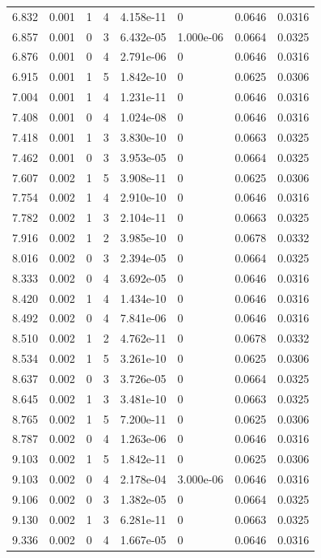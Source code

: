 \documentclass[preview]{standalone}
\begin{document}
{{{\begin{tabular}{L{1.2cm}C{1.2cm} C{0.3cm}C{0.5cm} C{1.4cm}C{1.4cm} C{1.4cm}C{1.4cm}}
  6.832  &  0.001  & 1     &  4 &  4.158e-11  & 0  & 0.0646 &  0.0316   \\ 
  6.857  &  0.001  & 0     &  3 &  6.432e-05  & 1.000e-06  & 0.0664 &  0.0325   \\ 
  6.876  &  0.001  & 0     &  4 &  2.791e-06  & 0  & 0.0646 &  0.0316   \\ 
  6.915  &  0.001  & 1     &  5 &  1.842e-10  & 0  & 0.0625 &  0.0306   \\ 
  7.004  &  0.001  & 1     &  4 &  1.231e-11  & 0  & 0.0646 &  0.0316   \\ 
  7.408  &  0.001  & 0     &  4 &  1.024e-08  & 0  & 0.0646 &  0.0316   \\ 
  7.418  &  0.001  & 1     &  3 &  3.830e-10  & 0  & 0.0663 &  0.0325   \\ 
  7.462  &  0.001  & 0     &  3 &  3.953e-05  & 0  & 0.0664 &  0.0325   \\ 
  7.607  &  0.002  & 1     &  5 &  3.908e-11  & 0  & 0.0625 &  0.0306   \\ 
  7.754  &  0.002  & 1     &  4 &  2.910e-10  & 0  & 0.0646 &  0.0316   \\ 
  7.782  &  0.002  & 1     &  3 &  2.104e-11  & 0  & 0.0663 &  0.0325   \\ 
  7.916  &  0.002  & 1     &  2 &  3.985e-10  & 0  & 0.0678 &  0.0332   \\ 
  8.016  &  0.002  & 0     &  3 &  2.394e-05  & 0  & 0.0664 &  0.0325   \\ 
  8.333  &  0.002  & 0     &  4 &  3.692e-05  & 0  & 0.0646 &  0.0316   \\ 
  8.420  &  0.002  & 1     &  4 &  1.434e-10  & 0  & 0.0646 &  0.0316   \\ 
  8.492  &  0.002  & 0     &  4 &  7.841e-06  & 0  & 0.0646 &  0.0316   \\ 
  8.510  &  0.002  & 1     &  2 &  4.762e-11  & 0  & 0.0678 &  0.0332   \\ 
  8.534  &  0.002  & 1     &  5 &  3.261e-10  & 0  & 0.0625 &  0.0306   \\ 
  8.637  &  0.002  & 0     &  3 &  3.726e-05  & 0  & 0.0664 &  0.0325   \\ 
  8.645  &  0.002  & 1     &  3 &  3.481e-10  & 0  & 0.0663 &  0.0325   \\ 
  8.765  &  0.002  & 1     &  5 &  7.200e-11  & 0  & 0.0625 &  0.0306   \\ 
  8.787  &  0.002  & 0     &  4 &  1.263e-06  & 0  & 0.0646 &  0.0316   \\ 
  9.103  &  0.002  & 1     &  5 &  1.842e-11  & 0  & 0.0625 &  0.0306   \\ 
  9.103  &  0.002  & 0     &  4 &  2.178e-04  & 3.000e-06  & 0.0646 &  0.0316   \\ 
  9.106  &  0.002  & 0     &  3 &  1.382e-05  & 0  & 0.0664 &  0.0325   \\ 
  9.130  &  0.002  & 1     &  3 &  6.281e-11  & 0  & 0.0663 &  0.0325   \\ 
  9.336  &  0.002  & 0     &  4 &  1.667e-05  & 0  & 0.0646 &  0.0316   \\ 
\hline 
\end{tabular} 

}}}
\end{document}
